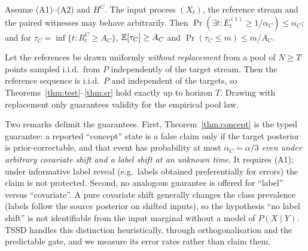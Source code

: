 \begin{theorem}
\label{thm:concept}
Assume (A1)--(A2) and $H^C$. The input process $(X_t)$, the reference stream and the paired witnesses may behave arbitrarily. Then $\Pr(\exists t: E^{(1)}_t\ge1/\alpha_C)\le\alpha_C$; and for $\tau_C=\inf\{t:R^C_t\ge A_C\}$, $\mathbb{E}[\tau_C]\ge A_C$ and $\Pr(\tau_C\le m)\le m/A_C$.
\end{theorem}

\begin{proposition}
\label{prop:pool}
Let the references be drawn uniformly \emph{without replacement} from a pool of $N\ge T$ points sampled i.i.d.\ from $P$ independently of the target stream. Then the reference sequence is i.i.d.\ $P$ and independent of the targets, so Theorems~\ref{thm:test}--\ref{thm:sr} hold exactly up to horizon $T$. Drawing with replacement only guarantees validity for the empirical pool law.
\end{proposition}

Two remarks delimit the guarantees. First, Theorem~\ref{thm:concept} is the typed guarantee: a reported ``concept'' state is a false claim only if the target posterior is prior-correctable, and that event has probability at most $\alpha_C=\alpha/3$ \emph{even under arbitrary covariate shift and a label shift at an unknown time}. It requires (A1); under informative label reveal (e.g.\ labels obtained preferentially for errors) the claim is not protected. Second, no analogous guarantee is offered for ``label'' versus ``covariate''. A pure covariate shift generally changes the class prevalence (labels follow the source posterior on shifted inputs), so the hypothesis ``no label shift'' is not identifiable from the input marginal without a model of $P(X\mid Y)$. TSSD handles this distinction heuristically, through orthogonalisation and the predictable gate, and we measure its error rates rather than claim them.
